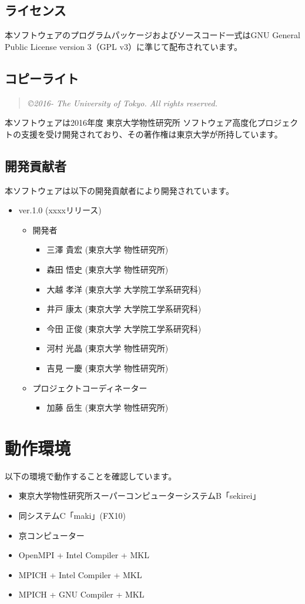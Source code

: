 \subsection{ライセンス}
本ソフトウェアのプログラムパッケージおよびソースコード一式はGNU General Public License version 3（GPL v3）に準じて配布されています。

\subsection{コピーライト}
\begin{quote}
{\it \copyright  2016- The University of Tokyo.} {\it All rights reserved.}
\end{quote}
本ソフトウェアは2016年度 東京大学物性研究所 ソフトウェア高度化プロジェクトの支援を受け開発されており、その著作権は東京大学が所持しています。

\subsection{開発貢献者}
\label{subsec:developers}
本ソフトウェアは以下の開発貢献者により開発されています。
\begin{itemize}
\item{ver.1.0 (xxxxリリース)}
\begin{itemize}
\item{開発者}
	\begin{itemize}
	\item{三澤 貴宏 (東京大学 物性研究所)}
	\item{森田 悟史 (東京大学 物性研究所)}
	\item{大越 孝洋 (東京大学 大学院工学系研究科)}
	\item{井戸 康太 (東京大学 大学院工学系研究科)}
	\item{今田 正俊 (東京大学 大学院工学系研究科)}
	\item{河村 光晶 (東京大学 物性研究所)}
	\item{吉見 一慶 (東京大学 物性研究所)}
	\end{itemize}

\item{プロジェクトコーディネーター}
	\begin{itemize}
	\item{加藤 岳生 (東京大学 物性研究所)}
	\end{itemize}

\end{itemize}

\end{itemize}


\section{動作環境}
 以下の環境で動作することを確認しています。
\begin{itemize}
\item 東京大学物性研究所スーパーコンピューターシステムB「sekirei」
\item 同システムC「maki」(FX10)
\item 京コンピューター
\item OpenMPI + Intel Compiler + MKL
\item MPICH + Intel Compiler + MKL
\item MPICH + GNU Compiler + MKL
\end{itemize}
